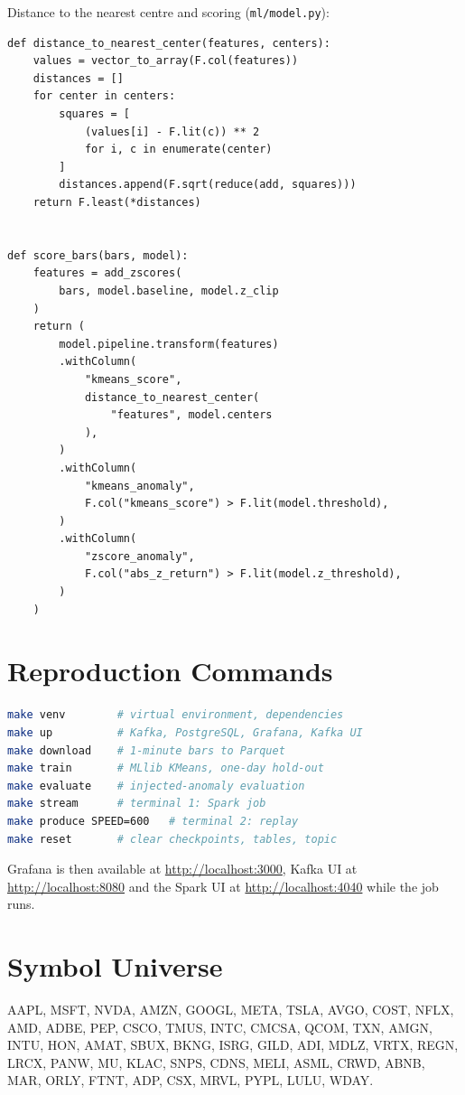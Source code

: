 \documentclass[conference]{IEEEtran}
\newcommand{\code}[1]{\texttt{#1}}
\begin{document}
Distance to the nearest centre and scoring (\code{ml/model.py}):
\begin{lstlisting}
def distance_to_nearest_center(features, centers):
    values = vector_to_array(F.col(features))
    distances = []
    for center in centers:
        squares = [
            (values[i] - F.lit(c)) ** 2
            for i, c in enumerate(center)
        ]
        distances.append(F.sqrt(reduce(add, squares)))
    return F.least(*distances)


def score_bars(bars, model):
    features = add_zscores(
        bars, model.baseline, model.z_clip
    )
    return (
        model.pipeline.transform(features)
        .withColumn(
            "kmeans_score",
            distance_to_nearest_center(
                "features", model.centers
            ),
        )
        .withColumn(
            "kmeans_anomaly",
            F.col("kmeans_score") > F.lit(model.threshold),
        )
        .withColumn(
            "zscore_anomaly",
            F.col("abs_z_return") > F.lit(model.z_threshold),
        )
    )
\end{lstlisting}

\section{Reproduction Commands}
\begin{lstlisting}[language=bash]
make venv        # virtual environment, dependencies
make up          # Kafka, PostgreSQL, Grafana, Kafka UI
make download    # 1-minute bars to Parquet
make train       # MLlib KMeans, one-day hold-out
make evaluate    # injected-anomaly evaluation
make stream      # terminal 1: Spark job
make produce SPEED=600   # terminal 2: replay
make reset       # clear checkpoints, tables, topic
\end{lstlisting}
Grafana is then available at \url{http://localhost:3000}, Kafka UI at \url{http://localhost:8080} and the Spark UI at \url{http://localhost:4040} while the job runs.

\section{Symbol Universe}
AAPL, MSFT, NVDA, AMZN, GOOGL, META, TSLA, AVGO, COST, NFLX, AMD, ADBE, PEP, CSCO, TMUS, INTC, CMCSA, QCOM, TXN, AMGN, INTU, HON, AMAT, SBUX, BKNG, ISRG, GILD, ADI, MDLZ, VRTX, REGN, LRCX, PANW, MU, KLAC, SNPS, CDNS, MELI, ASML, CRWD, ABNB, MAR, ORLY, FTNT, ADP, CSX, MRVL, PYPL, LULU, WDAY.
\end{document}
